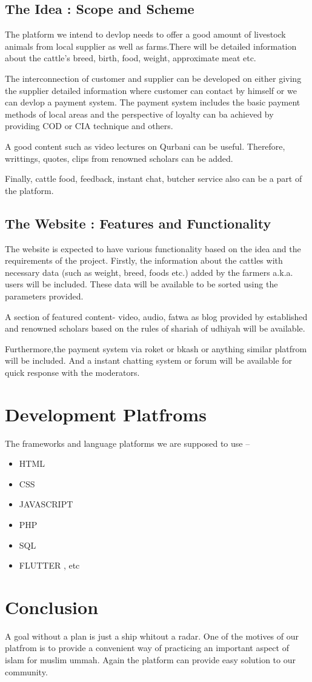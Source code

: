 \documentclass[a4paper,12pt]{report}
\begin{document}
\subsection*{The Idea : Scope and Scheme}
The platform we intend to devlop needs to offer a good amount of  livestock animals from local supplier as well as farms.There will be detailed information about the cattle's breed, birth, food, weight, approximate meat etc.

The interconnection of customer and supplier can be developed on either giving the supplier detailed information where customer can contact by himself or we can devlop a payment system.
The payment system includes the basic payment methods of local areas and the perspective of loyalty can ba achieved by providing COD or CIA technique and others.

A good content such as video lectures on Qurbani can be useful. Therefore, writtings, quotes, clips from renowned scholars can be added.

Finally, cattle food, feedback, instant chat, butcher service also can be a part of the platform.

\subsection*{The Website : Features and Functionality}
The website is expected to have various functionality based on the idea and the requirements of the project. Firstly, the information about the cattles with necessary data (such as weight, breed, foods etc.) added by the farmers a.k.a. users will be included. These data will be available to be sorted using the parameters provided. 

A section of featured content- video, audio, fatwa as blog provided by established and renowned scholars based on the rules of shariah of udhiyah will be available.

Furthermore,the payment system via roket or bkash or anything similar platfrom will be included. And a instant chatting system or forum will be available for quick response with the moderators.

\section*{Development Platfroms}
The frameworks and language platforms we are supposed to use --
\begin{itemize}
	\item HTML
	\item CSS
	\item JAVASCRIPT
	\item PHP
	\item SQL
	\item FLUTTER , etc
\end{itemize}

\section*{Conclusion}
A goal without a plan is just a ship whitout a radar. One of the motives of our platfrom is to provide a convenient way of practicing an important aspect of islam for muslim ummah. Again the platform can provide easy solution to our community.
\end{document}
